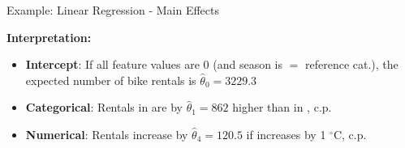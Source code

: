 \documentclass[11pt,compress,t,notes=noshow, aspectratio=169, xcolor=table]{beamer}
\begin{document}
\begin{frame}{Example: Linear Regression - Main Effects}
\lz


%
\textbf{Interpretation:}

\begin{itemize}[<+->]
    \item \textbf{Intercept}:
    If all feature values are 0 (and season is  $\hat =$ reference cat.), the expected number of bike rentals is $\hat\theta_0 = 3229.3$
    \item \textbf{Categorical}: Rentals in  are by $\hat\theta_1 = 862$ higher than in , c.p.
    \item \textbf{Numerical}: Rentals increase by $\hat\theta_4 = 120.5$ if  increases by 1 $^{\circ}$C, c.p.

\end{itemize}
\end{frame}


\end{document}
